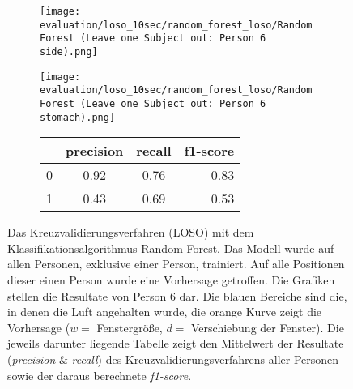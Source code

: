 \begin{figure}[ht]
\begin{subfigure}{1\textwidth}
    \end{subfigure}
    \begin{subfigure}{1\textwidth}
      \texttt{[image: evaluation/loso\_10sec/random\_forest\_loso/Random Forest (Leave one Subject out: Person 6 side).png]}
    \end{subfigure}
    \begin{subfigure}{1\textwidth}
      \texttt{[image: evaluation/loso\_10sec/random\_forest\_loso/Random Forest (Leave one Subject out: Person 6 stomach).png]}
  \end{subfigure}

  \begin{subfigure}{1\textwidth}
      \begin{center}
          \begin{tabular}{ | l | c | c | r | }
            \hline
             & precision & recall & f1-score\\ \hline
            0 & 0.92 & 0.76 & 0.83\\ \hline
            1 & 0.43 & 0.69 & 0.53\\
            \hline
          \end{tabular}
      \end{center}
  \end{subfigure}
    \caption{Das Kreuzvalidierungsverfahren (LOSO) mit dem Klassifikationsalgorithmus Random Forest. Das Modell wurde auf allen Personen, exklusive einer Person, trainiert. Auf alle Positionen dieser einen Person wurde eine Vorhersage getroffen. Die Grafiken stellen die Resultate von Person 6 dar. Die blauen Bereiche sind die, in denen die Luft angehalten wurde, die orange Kurve zeigt die Vorhersage ($w=$ Fenstergröße, $d=$ Verschiebung der Fenster). Die jeweils darunter liegende Tabelle zeigt den Mittelwert der Resultate (\textit{precision} \& \textit{recall}) des Kreuzvalidierungsverfahrens aller Personen sowie der daraus berechnete \textit{f1-score}.}
\label{evaluation:random_forest_loso:person6}
\end{figure}


